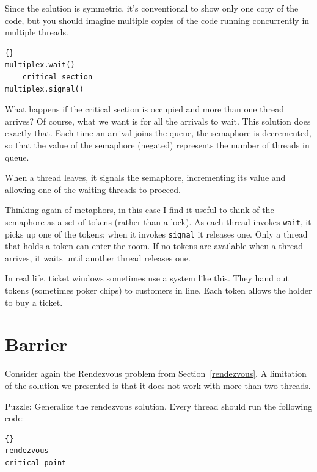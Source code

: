 \documentclass{book}
\begin{document}
Since the solution is symmetric, it's conventional to show only one
copy of the code, but you should imagine multiple copies of the code
running concurrently in multiple threads.

\begin{latin}
\begin{latin}
\begin{lstlisting}[title={Multiplex solution}]{}
multiplex.wait()
    critical section 
multiplex.signal()      
\end{lstlisting}
\end{latin}
\end{latin}

What happens if the critical section is occupied and more than one
thread arrives?  Of course, what we want is for all the arrivals to
wait.  This solution does exactly that.  Each time an arrival joins
the queue, the semaphore is decremented, so that the value of the
semaphore (negated) represents the number of threads in queue.

When a thread leaves, it signals the semaphore, incrementing
its value and allowing one of the waiting threads to proceed.

Thinking again of metaphors, in this case I find it useful
to think of the semaphore as a set of tokens (rather than
a lock).
As each thread invokes {\tt wait}, it picks up one of
the tokens; when it invokes {\tt signal} it releases one.
Only a thread that holds a token can enter the room.  If no
tokens are available when a thread arrives, it waits until
another thread releases one.

In real life, ticket windows sometimes use a system like
this.  They hand out tokens (sometimes poker chips) to
customers in line.  Each token allows the holder to buy a ticket.




\section{Barrier}

Consider again the Rendezvous problem from Section~\ref{rendezvous}.
A limitation of the solution we presented is that it does
not work with more than two threads.

Puzzle: Generalize the rendezvous solution.  Every thread should
run the following code:

\begin{latin}
\begin{latin}
\begin{lstlisting}[title={Barrier code}]{}
rendezvous
critical point
\end{lstlisting}
\end{latin}
\end{latin}
\end{document}
